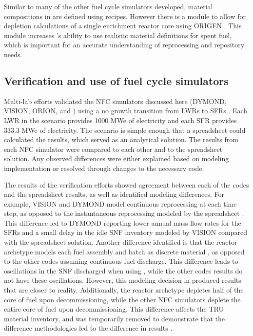 Similar to many of the other fuel cycle simulators developed, material 
compositions in \Cyclus are 
defined using recipes. However there is a module to allow for 
depletion calculations of a single enrichment reactor core using ORIGEN 
\cite{skutnik_cyborg_2016}. This module increases \Cyclus's ability 
to use realistic material definitions for spent fuel, which is 
important for an accurate understanding of reprocessing and repository 
needs. 

\subsection{Verification and use of fuel cycle simulators}
Multi-lab efforts validated the \gls{NFC} simulators discussed here 
(\gls{DYMOND}, \gls{VISION}, ORION, and \Cyclus)
using a no growth transition from \glspl{LWR} 
to \glspl{SFR} \cite{feng_sensitivity_2020,bae_standardized_2019}.
Each \gls{LWR} in the scenario provides 1000 MWe of 
electricity and each \gls{SFR} provides 333.3 MWe of electricity. The 
scenario is simple enough that a spreadsheet could calculated the results, 
which served as an analytical solution. The 
results from each \gls{NFC} simulator were compared to each other and 
to the spreadsheet solution. Any observed differences were either explained 
based on modeling implementation or resolved through changes to the 
necessary code.

The results of the verification efforts showed agreement between each 
of the codes and the spreadsheet results, as well as identified modeling 
differences. For example, \gls{VISION} and \gls{DYMOND} model continuous 
reprocessing at each time step, as opposed to the instantaneous 
reprocessing modeled by the spreadsheet \cite{feng_standardized_2016}. 
This difference led to \gls{DYMOND} reporting lower annual mass flow 
rates for the \glspl{SFR} and a small delay in the idle \gls{SNF} 
inventory modeled by \gls{VISION} compared with the spreadsheet 
solution. 
Another difference identified is that the \Cycamore reactor 
archetype models each fuel assembly and batch as discrete material 
\cite{bae_standardized_2019}, as 
opposed to the other codes assuming continuous fuel discharge. 
This difference leads to oscillations in the \gls{SNF} discharged 
when using \Cyclus, while the other codes results do not have these 
oscillations.
However, this modeling decision in \Cyclus produced results that 
are closer to reality. 
Additionally, the \Cycamore reactor archetype depletes half of the 
core of fuel upon decommissioning, while the other \gls{NFC} simulators 
deplete the entire core of fuel upon decommissioning. This 
difference affects the \gls{TRU} material inventory, and was 
temporarily removed to demonstrate that the difference 
methodologies led to the difference in results \cite{bae_standardized_2019}.


